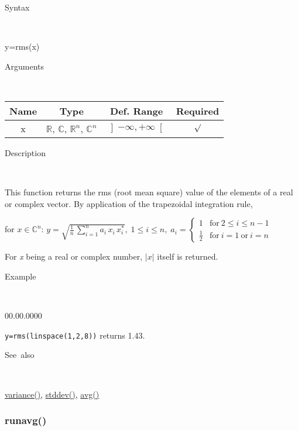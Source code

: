 \begin{description}
\item [Syntax]~
\end{description}
y=rms(x)

\begin{description}
\item [Arguments]~
\end{description}
\begin{tabular}{|c|c|c|c|}
\hline 
Name&
Type&
Def. Range&
Required\tabularnewline
\hline
\hline 
x&
$\mathbb{R}$, $\mathbb{C}$, $\mathbb{R}^{n}$, $\mathbb{C}^{n}$&
$\left]-\infty,+\infty\right[$&
$\surd$\tabularnewline
\hline
\end{tabular}

\begin{description}
\item [Description]~
\end{description}
This function returns the rms (root mean square) value of the elements
of a real or complex vector. By application of the trapezoidal integration
rule,

\medskip{}
for $x\in$$\mathbb{C}^{n}$: $y=\sqrt{{\displaystyle \frac{1}{n}}\,\sum\limits _{i=1}^{n}a_{i}\, x_{i}\, x_{i}^{*}}$$,\;1\leq i\leq n,\; a_{i}=\left\{ \begin{array}{cc}
1 & \mathrm{for}\:2\leq i\leq n-1\\
\frac{1}{2} & \mathrm{for}\: i=1\:\mathrm{or}\: i=n\end{array}\right.$
\medskip{}

For \textit{x} being a real or complex number, \textit{$\left|x\right|$}
itself is returned.

\begin{description}
\item [Example]~
\end{description}
\begin{lyxlist}{00.00.0000}
\item [\texttt{y=rms(linspace(1,2,8))}]returns 1.43.
\end{lyxlist}
\begin{description}
\item [See~also]~
\end{description}
\textcolor{blue}{\hyperlink{variance}{variance()}}\textcolor{black}{,}
\textcolor{blue}{\hyperlink{stddev}{stddev()}}\textcolor{black}{,}
\textcolor{blue}{\hyperlink{avg}{avg()}}


\newpage
\subsubsection*{\hypertarget{runavg}{}{\Large runavg()}}


